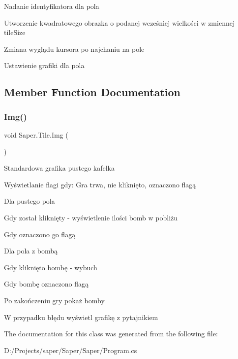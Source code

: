 Nadanie identyfikatora dla pola

Utworzenie kwadratowego obrazka o podanej wcześniej wielkości w zmiennej tile\+Size

Zmiana wyglądu kursora po najchaniu na pole

Ustawienie grafiki dla pola 

\subsection{Member Function Documentation}
\mbox{\label{class_saper_1_1_tile_a5d81eaa0b173ccb79598393706087e6d}} 
\subsubsection{\texorpdfstring{Img()}{Img()}}
{\footnotesize\ttfamily void Saper.\+Tile.\+Img (\begin{DoxyParamCaption}{ }\end{DoxyParamCaption})}

Standardowa grafika pustego kafelka

Wyświetlanie flagi gdy\+: Gra trwa, nie kliknięto, oznaczono flagą

Dla pustego pola

Gdy został kliknięty -\/ wyświetlenie ilości bomb w pobliżu

Gdy oznaczono go flagą

Dla pola z bombą

Gdy kliknięto bombę -\/ wybuch

Gdy bombę oznaczono flagą

Po zakończeniu gry pokaż bomby

W przypadku błędu wyświetl grafikę z pytajnikiem 

The documentation for this class was generated from the following file\+:\begin{DoxyCompactItemize}
\item 
D\+:/\+Projects/saper/\+Saper/\+Saper/Program.\+cs\end{DoxyCompactItemize}
